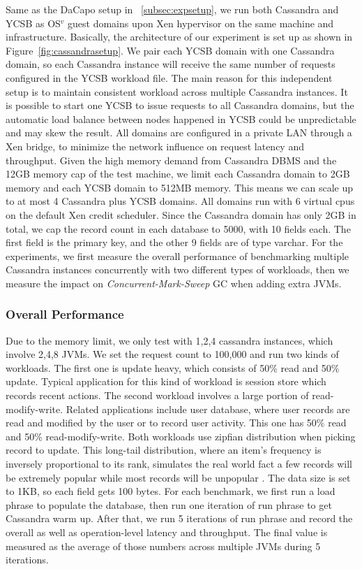 \documentclass{sig-alternate}
\begin{document}
Same as the DaCapo setup in ~\ref{subsec:expsetup}, we run both Cassandra and YCSB as OS$^{v}$ guest domains upon Xen hypervisor on the same machine and infrastructure. Basically, the architecture of our experiment is set up as shown in Figure~\ref{fig:cassandrasetup}. We pair each YCSB domain with one Cassandra domain, so each Cassandra instance will receive the same number of requests configured in the YCSB workload file. The main reason for this independent setup is to maintain consistent workload across multiple Cassandra instances. It is possible to start one YCSB to issue requests to all Cassandra domains, but the automatic load balance between nodes happened in YCSB could be unpredictable and may skew the result. All domains are configured in a private LAN through a Xen bridge, to minimize the network influence on request latency and throughput. Given the high memory demand from Cassandra DBMS and the 12GB memory cap of the test machine, we limit each Cassandra domain to 2GB memory and each YCSB domain to 512MB memory. This means we can scale up to at most 4 Cassandra plus YCSB domains. All domains run with 6 virtual cpus on the default Xen credit scheduler. Since the Cassandra domain has only 2GB in total, we cap the record count in each database to 5000, with 10 fields each. The first field is the primary key, and the other 9 fields are of type varchar. For the experiments, we first measure the overall performance of benchmarking multiple Cassandra instances concurrently with two different types of workloads, then we measure the impact on \textit{Concurrent-Mark-Sweep} GC when adding extra JVMs.

\subsubsection{Overall Performance}
Due to the memory limit, we only test with 1,2,4 cassandra instances, which involve 2,4,8 JVMs. We set the request count to 100,000 and run two kinds of workloads. The first one is update heavy, which consists of 50\% read and 50\% update. Typical application for this kind of workload is session store which records recent actions. The second workload involves a large portion of read-modify-write. Related applications include user database, where user records are read and modified by the user or to record user activity. This one has 50\% read and 50\% read-modify-write. Both workloads use zipfian distribution when picking record to update. This long-tail distribution, where an item's frequency is inversely proportional to its rank, simulates the real world fact a few records will be extremely popular while most records will be unpopular \cite{adamic2002zipf}. The data size is set to 1KB, so each field gets 100 bytes. For each benchmark, we first run a load phrase to populate the database, then run one iteration of run phrase to get Cassandra warm up. After that, we run 5 iterations of run phrase and record the overall as well as operation-level latency and throughput. The final value is measured as the average of those numbers across multiple JVMs during 5 iterations.
\end{document}
